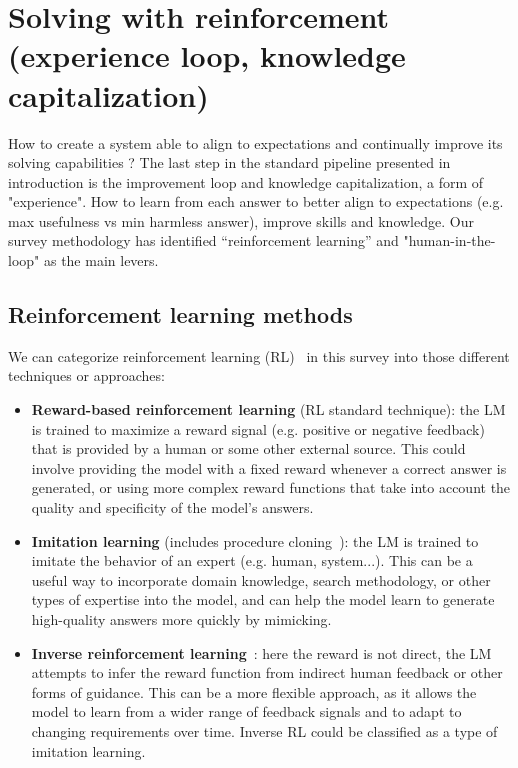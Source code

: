 \documentclass[acmsmall]{acmart}
\begin{document}
\section{Solving with reinforcement (experience loop, knowledge capitalization)} \label{sec_ImprovementLoop_and_kg_capitalization}
How to create a system able to align to expectations and continually improve its solving capabilities ? The last step in the standard pipeline presented in introduction is the improvement loop and knowledge capitalization, a form of "experience". How to learn from each answer to better align to expectations (e.g. max usefulness vs min harmless answer), improve skills and knowledge. Our survey methodology has identified “reinforcement learning” and "human-in-the-loop" as the main levers.

\subsection{Reinforcement learning methods}
We can categorize reinforcement learning (RL)~\citep{suttonReinforcementLearningSecond2018} in this survey into those different techniques or approaches:
\begin{itemize}
     \item \textbf{Reward-based reinforcement learning} (RL standard technique): the LM is trained to maximize a reward signal (e.g. positive or negative feedback) that is provided by a human or some other external source. This could involve providing the model with a fixed reward whenever a correct answer is generated, or using more complex reward functions that take into account the quality and specificity of the model's answers.
     \item \textbf{Imitation learning} (includes procedure cloning~\citep{yangChainThoughtImitation2022}): the LM is trained to imitate the behavior of an expert (e.g. human, system...). This can be a useful way to incorporate domain knowledge, search methodology, or other types of expertise into the model, and can help the model learn to generate high-quality answers more quickly by mimicking.
     \item \textbf{Inverse reinforcement learning}~\citep{zhouInverseReinforcementLearning2020}: here the reward is not direct, the LM attempts to infer the reward function from indirect human feedback or other forms of guidance. This can be a more flexible approach, as it allows the model to learn from a wider range of feedback signals and to adapt to changing requirements over time. Inverse RL could be classified as a type of imitation learning.
\end{itemize}
\end{document}
